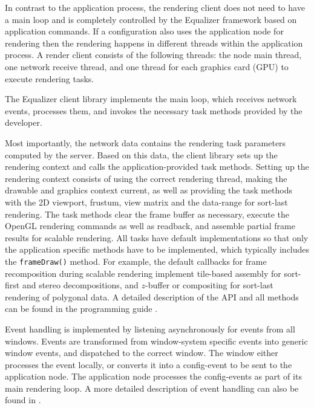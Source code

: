 In contrast to the application process, the rendering client does not need to
have a main loop and is completely controlled by the Equalizer framework based
on application commands. If a configuration also uses the application node for
rendering then the rendering happens in different threads within the application
process. A render client consists of the following threads: the node main
thread, one network receive thread, and one thread for each graphics card (GPU)
to execute rendering tasks.

The Equalizer client library implements the main loop, which receives network
events, processes them, and invokes the necessary task methods provided by the
developer.

Most importantly, the network data contains the rendering task
parameters computed by the server. Based on this data, the client library sets
up the rendering context and calls the application-provided task methods.
Setting up the rendering context consists of using the correct rendering thread,
making the drawable and graphics context current, as well as providing the task
methods with the 2D viewport, frustum, view matrix and the data-range for
sort-last rendering. The task methods clear the frame buffer as necessary,
execute the OpenGL rendering commands as well as readback, and assemble partial
frame results for scalable rendering. All tasks have default implementations so
that only the application specific methods have to be implemented, which
typically includes the {\tt frameDraw()} method. For example, the default
callbacks for frame recomposition during scalable rendering implement tile-based
assembly for sort-first and stereo decompositions, and $z$-buffer or compositing
for sort-last rendering of polygonal data.
A detailed description of the API and all methods can be found in the programming
guide \cite{Eilemann:07}.

Event handling is implemented by listening asynchronously for events
from all windows. Events are transformed from window-system specific
events into generic window events, and dispatched to the correct
window. The window either processes the event locally, or converts it
into a config-event to be sent to the application node. The application
node processes the config-events as part of its main rendering loop. A
more detailed description of event handling can also be found in \cite {Eilemann:07}.


